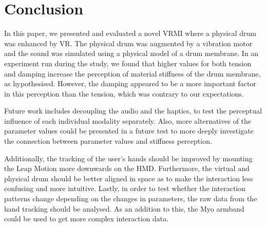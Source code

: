 \documentclass{article}
\begin{document}
\section{Conclusion}\label{sec:conc}

In this paper, we presented and evaluated a novel VRMI where a physical drum was enhanced by VR. The physical drum was augmented by a vibration motor and the sound was simulated using a physical model of a drum membrane. In an experiment run during the study, we found that higher values for both tension and damping increase the perception of material stiffness of the drum membrane, as hypothesised. However, the damping appeared to be a more important factor in this perception than the tension, which was contrary to our expectations.

Future work includes decoupling the audio and the haptics, to test the perceptual influence of each individual modality separately. Also, more alternatives of the parameter values could be presented in a future test to more deeply investigate the connection between parameter values and stiffness perception.

Additionally, the tracking of the user's hands should be improved by mounting the Leap Motion more downwards on the HMD. Furthermore, the virtual and physical drum should be better aligned in space as to make the interaction less confusing and more intuitive. Lastly, in order to test whether the interaction patterns change depending on the changes in parameters, the raw data from the hand tracking should be analysed. As an addition to this, the Myo armband could be used to get more complex interaction data.


\end{document}
